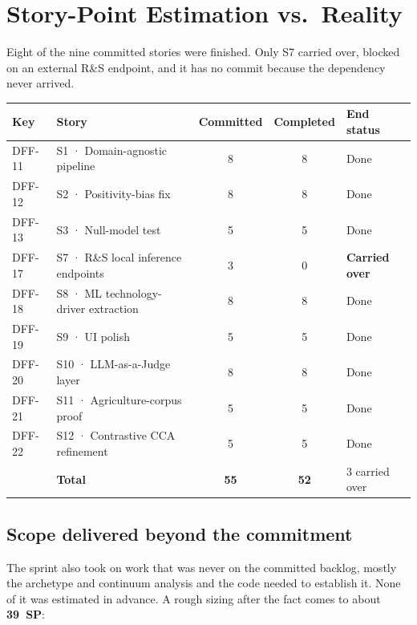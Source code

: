 \documentclass[11pt,a4paper]{article}
\begin{document}
\section{Story-Point Estimation vs.\ Reality}
Eight of the nine committed stories were finished. Only S7 carried over, blocked on an external R\&S
endpoint, and it has no commit because the dependency never arrived.

\begin{center}\small
\begin{tabular}{@{}llccl@{}}
\toprule
\textbf{Key} & \textbf{Story} & \textbf{Committed} & \textbf{Completed} & \textbf{End status} \\
\midrule
DFF-11 & S1 · Domain-agnostic pipeline      & 8 & 8 & Done \\
DFF-12 & S2 · Positivity-bias fix           & 8 & 8 & Done \\
DFF-13 & S3 · Null-model test               & 5 & 5 & Done \\
DFF-17 & S7 · R\&S local inference endpoints & 3 & 0 & \textbf{Carried over} \\
DFF-18 & S8 · ML technology-driver extraction & 8 & 8 & Done \\
DFF-19 & S9 · UI polish                     & 5 & 5 & Done \\
DFF-20 & S10 · LLM-as-a-Judge layer         & 8 & 8 & Done \\
DFF-21 & S11 · Agriculture-corpus proof     & 5 & 5 & Done \\
DFF-22 & S12 · Contrastive CCA refinement   & 5 & 5 & Done \\
\midrule
& \textbf{Total} & \textbf{55} & \textbf{52} & 3 carried over \\
\bottomrule
\end{tabular}
\end{center}

\subsection*{Scope delivered beyond the commitment}
The sprint also took on work that was never on the committed backlog, mostly the archetype and continuum
analysis and the code needed to establish it. None of it was estimated in advance. A rough sizing after the
fact comes to about \textbf{39~SP}:
\end{document}
